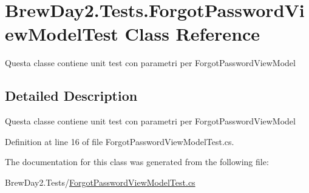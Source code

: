 \hypertarget{class_brew_day2_1_1_tests_1_1_forgot_password_view_model_test}{}\section{Brew\+Day2.\+Tests.\+Forgot\+Password\+View\+Model\+Test Class Reference}
\label{class_brew_day2_1_1_tests_1_1_forgot_password_view_model_test}


Questa classe contiene unit test con parametri per Forgot\+Password\+View\+Model 




\subsection{Detailed Description}
Questa classe contiene unit test con parametri per Forgot\+Password\+View\+Model



Definition at line 16 of file Forgot\+Password\+View\+Model\+Test.\+cs.



The documentation for this class was generated from the following file\+:\begin{DoxyCompactItemize}
\item 
Brew\+Day2.\+Tests/\mbox{\hyperlink{_forgot_password_view_model_test_8cs}{Forgot\+Password\+View\+Model\+Test.\+cs}}\end{DoxyCompactItemize}
